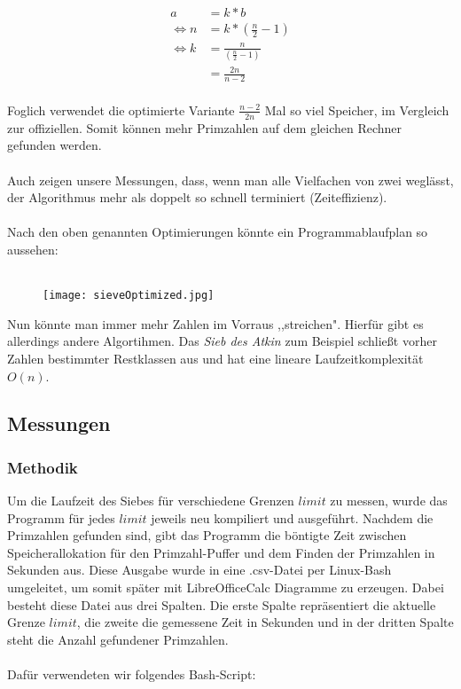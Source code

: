 \documentclass[a4paper,12pt]{article}
\begin{document}
\begin{align}
a &= k * b\\
\Leftrightarrow n &= k * ( \frac{n}{2} - 1 )\\
\Leftrightarrow k &= \frac{n}{( \frac{n}{2} - 1 )}\\
&= \frac{2n}{n-2}
\end{align}
\\
Foglich verwendet die optimierte Variante $\frac{n-2}{2n}$ Mal so viel Speicher, im Vergleich zur offiziellen. Somit können mehr Primzahlen auf dem gleichen Rechner gefunden werden.\\
\\
Auch zeigen unsere Messungen, dass, wenn man alle Vielfachen von zwei weglässt, der Algorithmus mehr als doppelt so schnell terminiert (Zeiteffizienz).\\
\\
Nach den oben genannten Optimierungen könnte ein Programmablaufplan so aussehen:\\\\
\begin{figure}[H]
\texttt{[image: sieveOptimized.jpg]}
\end{figure}

\noindent Nun könnte man immer mehr Zahlen im Vorraus ,,streichen". Hierfür gibt es allerdings andere Algortihmen. Das \emph{Sieb des Atkin} zum Beispiel schließt vorher Zahlen bestimmter Restklassen aus und hat eine lineare Laufzeitkomplexität $O(n)$.

\subsection{Messungen}
\subsubsection{Methodik}
Um die Laufzeit des Siebes für verschiedene Grenzen $limit$ zu messen, wurde das Programm für jedes $limit$ jeweils neu kompiliert und ausgeführt. Nachdem die Primzahlen gefunden sind, gibt das Programm die böntigte Zeit zwischen Speicherallokation für den Primzahl-Puffer und dem Finden der Primzahlen in Sekunden aus. Diese Ausgabe wurde in eine .csv-Datei per Linux-Bash umgeleitet, um somit später mit LibreOfficeCalc Diagramme zu erzeugen. Dabei besteht diese Datei aus drei Spalten. Die erste Spalte repräsentiert die aktuelle Grenze $limit$, die zweite die gemessene Zeit in Sekunden und in der dritten Spalte steht die Anzahl gefundener Primzahlen.
\\\\
\noindent Dafür verwendeten wir folgendes Bash-Script:
\end{document}
